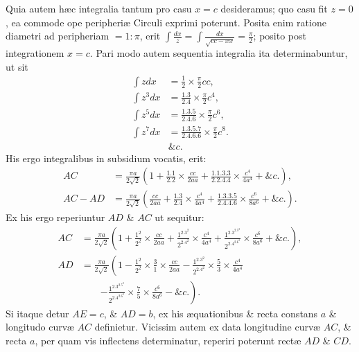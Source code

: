 Quia autem hæc integralia tantum pro casu $x=c$ desideramus; quo casu fit $z=0$, ea commode ope peripheriæ Circuli exprimi poterunt. Posita enim ratione diametri ad peripheriam $=1:\pi$, erit $\int\frac{dx}z=\int\frac{dx}{\sqrt{cc-xx}}=\frac\pi2$; posito post integrationem $x=c$. Pari modo autem sequentia integralia ita determinabuntur, ut sit
\[\begin{aligned}
\int zdx&=\frac12\times\frac\pi2cc,\\
\int z^3dx&=\frac{1.3}{2.4}\times\frac\pi2c^4,\\
\int z^5dx&=\frac{1.3.5}{2.4.6}\times\frac\pi2c^6,\\
\int z^7dx&=\frac{1.3.5.7}{2.4.6.6}\times\frac\pi2c^8.\\
&\&c.
\end{aligned}\]
His ergo integralibus in subsidium vocatis, erit:
\[\begin{aligned}
AC&=\frac{\pi a}{2\sqrt2}\left(1+\frac{1.1}{2.2}\times\frac{cc}{2aa}+\frac{1.1.3.3}{2.2.4.4}\times\frac{c^4}{4a^4}+\&c.\right),\\
AC-AD&=\frac{\pi a}{2\sqrt2}\left(\frac{cc}{2aa}+\frac{1.3}{2.4}\times\frac{c^4}{4a^4}+\frac{1.3.3.5}{2.4.4.6}\times\frac{c^6}{8a^6}+\&c.\right).
\end{aligned}\]
Ex his ergo reperiuntur $AD$ \& $AC$ ut sequitur:
\[\begin{aligned}
AC&=\frac{\pi a}{2\sqrt2}\left(1+\frac{1^2}{2^2}\times\frac{cc}{2aa}+\frac{1^2.3^2}{2^2.4^2}\times\frac{c^4}{4a^4}+\frac{1^2.3^2.5^2}{2^2.4^2.6^2}\times\frac{c^6}{8a^6}+\&c.\right),\\
AD&=\frac{\pi a}{2\sqrt2}\left(1-\frac{1^2}{2^2}\times\frac31\times\frac{cc}{2aa}-\frac{1^2.3^2}{2^2.4^2}\times\frac53\times\frac{c^4}{4a^4}\right.\\
&\qquad\left.-\frac{1^2.3^2.5^2}{2^2.4^2.6^2}\times\frac75\times\frac{c^6}{8a^6}-\&c.\right).
\end{aligned}\]
Si itaque detur $AE=c$, \& $AD=b$, ex his æquationibus \& recta constans $a$ \& longitudo curvæ $AC$ definietur. Vicissim autem ex data longitudine curvæ $AC$, \& recta $a$, per quam vis inflectens determinatur, reperiri poterunt rectæ $AD$ \& $CD$.

